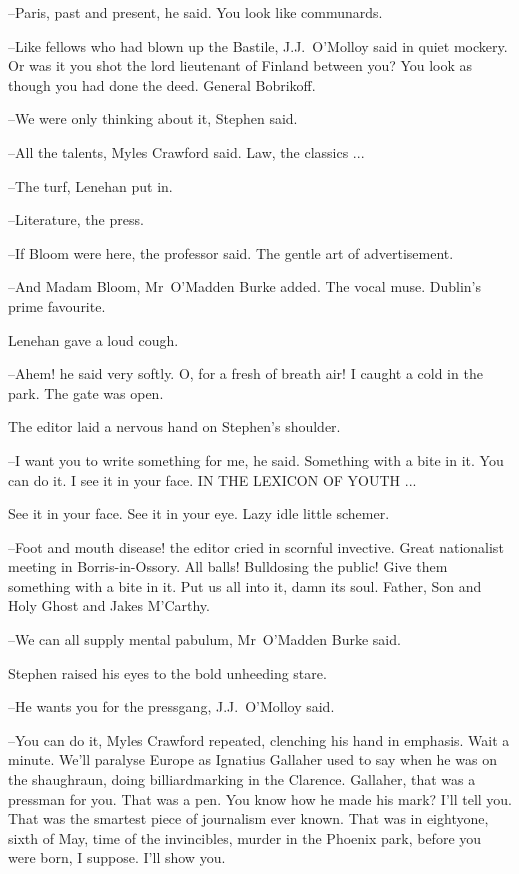 --Paris, past and present,
he said.
You look like communards.

--Like fellows who had blown up the Bastile,
J.J.~O'Molloy said in quiet mockery.
Or was it you shot the lord lieutenant of Finland between you?
You look as though you had done the deed.
General Bobrikoff.



--We were only thinking about it,
Stephen said.

--All the talents,
Myles Crawford said.
Law,
the classics ...

--The turf,
Lenehan put in.

--Literature,
the press.

--If Bloom were here,
the professor said.
The gentle art of advertisement.

--And Madam Bloom,
Mr~O'Madden Burke added.
The vocal muse.
Dublin's prime favourite.

Lenehan gave a loud cough.

--Ahem!
he said very softly.
O, for a fresh of breath air!
I caught a cold in the park.
The gate was open.



The editor laid a nervous hand on Stephen's shoulder.

--I want you to write something for me,
he said.
Something with a bite in it.
You can do it.
I see it in your face.
IN THE LEXICON OF YOUTH ...

See it in your face.
See it in your eye.
Lazy idle little schemer.

--Foot and mouth disease!
the editor cried in scornful invective.
Great nationalist meeting in Borris-in-Ossory.
All balls!
Bulldosing the public!
Give them something with a bite in it.
Put us all into it,
damn its soul.
Father, Son and Holy Ghost
and Jakes M'Carthy.

--We can all supply mental pabulum,
Mr~O'Madden Burke said.

Stephen raised his eyes to the bold unheeding stare.

--He wants you for the pressgang,
J.J.~O'Molloy said.



--You can do it,
Myles Crawford repeated,
clenching his hand in emphasis.
Wait a minute.
We'll paralyse Europe as Ignatius Gallaher used to say
when he was on the shaughraun,
doing billiardmarking in the Clarence.
Gallaher, that was a pressman for you.
That was a pen.
You know how he made his mark?
I'll tell you.
That was the smartest piece of journalism ever known.
That was in eightyone, sixth of May,
time of the invincibles,
murder in the Phoenix park,
before you were born, I suppose.
I'll show you.

